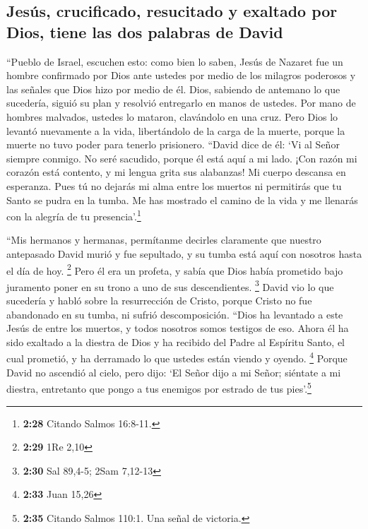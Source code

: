 \hypertarget{jesuxfas-crucificado-resucitado-y-exaltado-por-dios-tiene-las-dos-palabras-de-david}{%
\subsection{Jesús, crucificado, resucitado y exaltado por Dios, tiene
las dos palabras de
David}\label{jesuxfas-crucificado-resucitado-y-exaltado-por-dios-tiene-las-dos-palabras-de-david}}

 ``Pueblo de Israel, escuchen esto: como bien lo saben,
Jesús de Nazaret fue un hombre confirmado por Dios ante ustedes por
medio de los milagros poderosos y las señales que Dios hizo por medio de
él.  Dios, sabiendo de antemano lo que sucedería, siguió
su plan y resolvió entregarlo en manos de ustedes. Por mano de hombres
malvados, ustedes lo mataron, clavándolo en una cruz. 
Pero Dios lo levantó nuevamente a la vida, libertándolo de la carga de
la muerte, porque la muerte no tuvo poder para tenerlo prisionero.
 ``David dice de él: `Vi al Señor siempre conmigo. No
seré sacudido, porque él está aquí a mi lado.  ¡Con razón
mi corazón está contento, y mi lengua grita sus alabanzas! Mi cuerpo
descansa en esperanza.  Pues tú no dejarás mi alma entre
los muertos ni permitirás que tu Santo se pudra en la tumba.
 Me has mostrado el camino de la vida y me llenarás con
la alegría de tu presencia'.\footnote{\textbf{2:28} Citando Salmos
  16:8-11.}

 ``Mis hermanos y hermanas, permítanme decirles
claramente que nuestro antepasado David murió y fue sepultado, y su
tumba está aquí con nosotros hasta el día de hoy. \footnote{\textbf{2:29}
  1Re 2,10}  Pero él era un profeta, y sabía que Dios
había prometido bajo juramento poner en su trono a uno de sus
descendientes. \footnote{\textbf{2:30} Sal 89,4-5; 2Sam 7,12-13}
 David vio lo que sucedería y habló sobre la resurrección
de Cristo, porque Cristo no fue abandonado en su tumba, ni sufrió
descomposición.  ``Dios ha levantado a este Jesús de
entre los muertos, y todos nosotros somos testigos de eso.
 Ahora él ha sido exaltado a la diestra de Dios y ha
recibido del Padre al Espíritu Santo, el cual prometió, y ha derramado
lo que ustedes están viendo y oyendo. \footnote{\textbf{2:33} Juan 15,26}
 Porque David no ascendió al cielo, pero dijo: `El Señor
dijo a mi Señor; siéntate a mi diestra,  entretanto que
pongo a tus enemigos por estrado de tus pies'.\footnote{\textbf{2:35}
  Citando Salmos 110:1. Una señal de victoria.}


